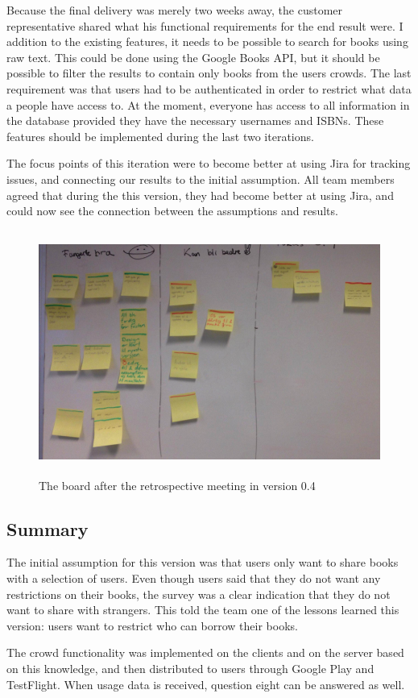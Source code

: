 Because the final delivery was merely two weeks away, the customer representative shared what his functional requirements for the end result were. I addition to the existing features, it needs to be possible to search for books using raw text. This could be done using the Google Books API, but it should be possible to filter the results to contain only books from the users crowds. The last requirement was that users had to be authenticated in order to restrict what data a people have access to. At the moment, everyone has access to all information in the database provided they have the necessary usernames and \gls{ISBN}s. These features should be implemented during the last two iterations.

The focus points of this iteration were to become better at using Jira for tracking issues, and connecting our results to the initial assumption. All team members agreed that during the this version, they had become better at using Jira, and could now see the connection between the assumptions and results.

\begin{figure}
\centering
\includegraphics[height=8cm]{figs/v04/retrospective.png}
\caption{The board after the retrospective meeting in version 0.4}
\label{fig:retrospective-4}
\end{figure}


\subsection{Summary}
The initial assumption for this version was that users only want to share books with a selection of users. Even though users said that they do not want any restrictions on their books, the survey was a clear indication that they do not want to share with strangers. This told the team one of the lessons learned this version: users want to restrict who can borrow their books.

The crowd functionality was implemented on the clients and on the server based on this knowledge, and then distributed to users through Google Play and TestFlight.\cite{google-play}\cite{testflight} When usage data is received, question eight can be answered as well.
